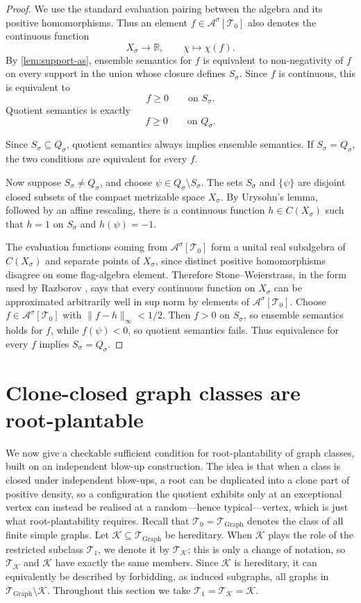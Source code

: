 \documentclass[11pt]{article}
\theoremstyle{definition}
\newcommand{\R}{\mathbb{R}}
\newcommand{\A}{\mathcal{A}}
\newcommand{\K}{\mathcal{K}}
\newcommand{\T}{\mathcal{T}}
\begin{document}
\begin{proof}
We use the standard evaluation pairing between the algebra and its positive
homomorphisms.  Thus an element $f\in\A^\sigma[\T_0]$ also denotes the continuous
function
\[
  X_\sigma\longrightarrow\R,\qquad \chi\longmapsto \chi(f).
\]
By \cref{lem:support-as}, ensemble semantics for $f$ is equivalent to
non-negativity of $f$ on every support in the union whose closure defines
$S_\sigma$.  Since $f$ is continuous, this is equivalent to
\[
  f\ge0\qquad\text{on }S_\sigma.
\]
Quotient semantics is exactly
\[
  f\ge0\qquad\text{on }Q_\sigma.
\]

Since $S_\sigma\subseteq Q_\sigma$, quotient semantics always implies ensemble
semantics.  If $S_\sigma=Q_\sigma$, the two conditions are equivalent for every $f$.

Now suppose $S_\sigma\ne Q_\sigma$, and choose
$\psi\in Q_\sigma\setminus S_\sigma$.  The sets $S_\sigma$ and $\{\psi\}$ are disjoint
closed subsets of the compact metrizable space $X_\sigma$.  By Urysohn's lemma, followed
by an affine rescaling, there is a continuous function $h\in C(X_\sigma)$ such that
$h=1$ on $S_\sigma$ and $h(\psi)=-1$.

The evaluation functions coming from $\A^\sigma[\T_0]$ form a unital real subalgebra of
$C(X_\sigma)$ and separate points of $X_\sigma$, since distinct positive homomorphisms
disagree on some flag-algebra element.  Therefore Stone--Weierstrass, in the form used
by Razborov \cite[Proposition 3.7]{Razborov2007}, says that every continuous function on
$X_\sigma$ can be approximated arbitrarily well in sup norm by elements of
$\A^\sigma[\T_0]$.  Choose $f\in\A^\sigma[\T_0]$ with
$\|f-h\|_\infty<1/2$.  Then $f>0$ on $S_\sigma$, so ensemble semantics holds for $f$,
while $f(\psi)<0$, so quotient semantics fails.  Thus equivalence for every $f$ implies
$S_\sigma=Q_\sigma$.
\end{proof}

\section{Clone-closed graph classes are root-plantable}

We now give a checkable sufficient condition for root-plantability of graph
classes, built on an independent blow-up construction.  The idea is that when a class is
closed under independent blow-ups, a root can be duplicated into a clone part
of positive density, so a configuration the quotient exhibits only at an exceptional vertex
can instead be realised at a random---hence typical---vertex, which is just what
root-plantability requires.  Recall that $\T_0=\T_{\mathrm{Graph}}$ denotes the class of
all finite simple graphs.  Let $\K\subseteq\T_{\mathrm{Graph}}$ be hereditary.  When
$\K$ plays the role of the restricted subclass $\T_1$, we denote it by $\T_\K$; this is
only a change of notation, so $\T_\K$ and $\K$ have exactly the same members.  Since
$\K$ is hereditary, it can equivalently be described by forbidding, as induced
subgraphs, all graphs in $\T_{\mathrm{Graph}}\setminus\K$.  Throughout this section we
take $\T_1=\T_\K=\K$.
\end{document}
